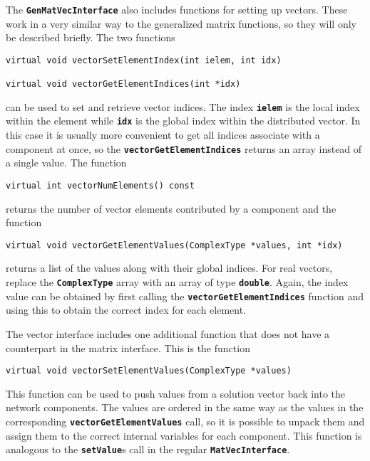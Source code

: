 The \texttt{\textbf{GenMatVecInterface}} also includes functions for setting up vectors. These work in a very similar way to the generalized matrix functions, so they will only be described briefly. The two functions

{
\color{red}
\begin{Verbatim}[fontseries=b]
virtual void vectorSetElementIndex(int ielem, int idx)

virtual void vectorGetElementIndices(int *idx)
\end{Verbatim}
}

can be used to set and retrieve vector indices. The index \texttt{\textbf{ielem}} is the local index within the element while \texttt{\textbf{idx}} is the global index within the distributed vector. In this case it is usually more convenient to get all indices associate with a component at once, so the \texttt{\textbf{vectorGetElementIndices}} returns an array instead of a single value. The function

{
\color{red}
\begin{Verbatim}[fontseries=b]
virtual int vectorNumElements() const
\end{Verbatim}
}

returns the number of vector elements contributed by a component and the function

{
\color{red}
\begin{Verbatim}[fontseries=b]
virtual void vectorGetElementValues(ComplexType *values, int *idx)
\end{Verbatim}
}

returns a list of the values along with their global indices. For real vectors, replace the \texttt{\textbf{ComplexType}} array with an array of type \texttt{\textbf{double}}. Again, the index value can be obtained by first calling the \texttt{\textbf{vectorGetElementIndices}} function and using this to obtain the correct index for each element.

The vector interface includes one additional function that does not have a counterpart in the matrix interface. This is the function

{
\color{red}
\begin{Verbatim}[fontseries=b]
virtual void vectorSetElementValues(ComplexType *values)
\end{Verbatim}
}

This function can be used to push values from a solution vector back into the network components. The values are ordered in the same way as the values in the corresponding \texttt{\textbf{vectorGetElementValues}} call, so it is possible to unpack them and assign them to the correct internal variables for each component. This function is analogous to the \texttt{\textbf{setValue}}s call in the regular \texttt{\textbf{MatVecInterface}}.

